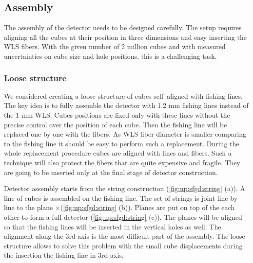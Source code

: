 \documentclass[main.tex]{subfiles}
\begin{document}
\subsection{Assembly}
\label{sec:up:sfgd:ass}
The assembly of the detector needs to be designed carefully. The setup requires aligning all the cubes at their position in three dimensions and easy inserting the WLS fibers. With the given number of 2 million cubes and with measured uncertainties on cube size and hole positions, this is a challenging task.

\subsubsection{Loose structure}
We considered creating a loose structure of cubes self--aligned with fishing lines. The key idea is to fully assemble the detector with 1.2 mm fishing lines instead of the 1 mm WLS. Cubes positions are fixed only with these lines without the precise control over the position of each cube. Then the fishing line will be replaced one by one with the fibers. As WLS fiber diameter is smaller comparing to the fishing line it should be easy to perform such a replacement. During the whole replacement procedure cubes are aligned with lines and fibers. Such a technique will also protect the fibers that are quite expensive and fragile. They are going to be inserted only at the final stage of detector construction.

Detector assembly starts from the string construction (\autoref{fig:up:sfgd:string} (a)). A line of \sfgdx cubes is assembled on the fishing line. The set of \sfgdy strings is joint line by line to the plane \sfgdx$\times$\sfgdy (\autoref{fig:up:sfgd:string} (b)). Planes are put on top of the each other to form a full detector (\autoref{fig:up:sfgd:string} (c)). The planes will be aligned so that the fishing lines will be inserted in the vertical holes as well. The alignment along the 3rd axis is the most difficult part of the assembly. The loose structure allows to solve this problem with the small cube displacements during the insertion the fishing line in 3rd axis.
\end{document}
